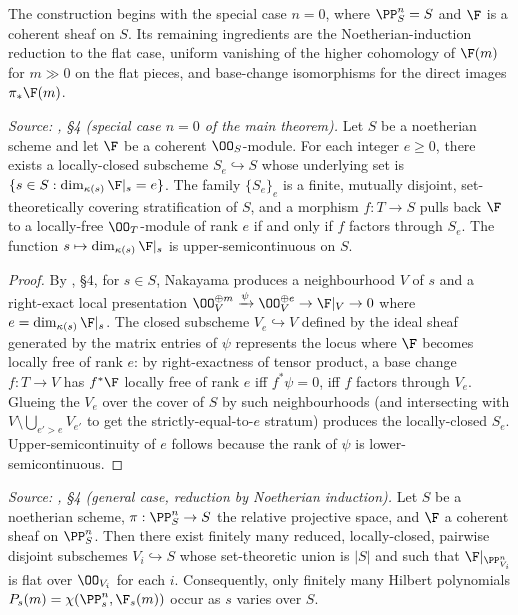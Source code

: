 The construction begins with the special case \(n = 0\), where
\(\PP^n_S = S\) and \(\F\) is a coherent sheaf on \(S\).  Its remaining
ingredients are the Noetherian-induction reduction to the flat case, uniform
vanishing of the higher cohomology of \(\F(m)\) for \(m \gg 0\) on the flat
pieces, and base-change isomorphisms for the direct images \(\pi_*\F(m)\).

\begin{lemma}
  \label{lem:flat_locus_open}
  \textit{Source: \cite{nitsure-hilbert-quot}, \S4 (special case \(n=0\) of the main theorem).}
  Let \(S\) be a noetherian scheme and let \(\F\) be a coherent \(\OO_S\)-module.
  For each integer \(e \ge 0\), there exists a locally-closed subscheme
  \(S_e \hookrightarrow S\) whose underlying set is
  \(\{s \in S : \dim_{\kappa(s)} \F|_s = e\}\). The family \(\{S_e\}_e\) is a
  finite, mutually disjoint, set-theoretically covering stratification of \(S\),
  and a morphism \(f : T \to S\) pulls back \(\F\) to a locally-free
  \(\OO_T\)-module of rank \(e\) if and only if \(f\) factors through \(S_e\).  The
  function \(s \mapsto \dim_{\kappa(s)} \F|_s\) is upper-semicontinuous on \(S\).
\end{lemma}

\begin{proof}
  By \cite{nitsure-hilbert-quot}, \S4, for \(s \in S\), Nakayama produces a
  neighbourhood \(V\) of \(s\) and a right-exact local presentation
  \(\OO_V^{\oplus m} \xrightarrow{\psi} \OO_V^{\oplus e} \to \F|_V \to 0\) where
  \(e = \dim_{\kappa(s)} \F|_s\).  The closed subscheme \(V_e \hookrightarrow V\)
  defined by the ideal sheaf generated by the matrix entries of \(\psi\)
  represents the locus where \(\F\) becomes locally free of rank \(e\): by
  right-exactness of tensor product, a base change \(f : T \to V\) has
  \(f^* \F\) locally free of rank \(e\) iff \(f^* \psi = 0\), iff \(f\) factors
  through \(V_e\).  Glueing the \(V_e\) over the cover of \(S\) by such
  neighbourhoods (and intersecting with \(V \setminus \bigcup_{e' > e} V_{e'}\)
  to get the strictly-equal-to-\(e\) stratum) produces the locally-closed
  \(S_e\). Upper-semicontinuity of \(e\) follows because the rank of \(\psi\) is
  lower-semicontinuous.
\end{proof}

\begin{lemma}
  \label{lem:nonflat_locus_proper}
  \textit{Source: \cite{nitsure-hilbert-quot}, \S4 (general case, reduction by Noetherian induction).}
  Let \(S\) be a noetherian scheme, \(\pi : \PP^n_S \to S\) the relative projective
  space, and \(\F\) a coherent sheaf on \(\PP^n_S\).  Then there exist finitely many
  reduced, locally-closed, pairwise disjoint subschemes \(V_i \hookrightarrow S\)
  whose set-theoretic union is \(|S|\) and such that \(\F|_{\PP^n_{V_i}}\) is
  flat over \(\OO_{V_i}\) for each \(i\). Consequently, only finitely many
  Hilbert polynomials \(P_s(m) = \chi(\PP^n_s, \F_s(m))\) occur as \(s\) varies
  over \(S\).
\end{lemma}

